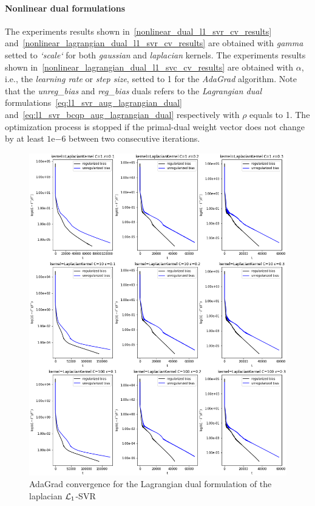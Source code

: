 \paragraph{Nonlinear dual formulations}

The experiments results shown in~\ref{nonlinear_dual_l1_svr_cv_results} and~\ref{nonlinear_lagrangian_dual_l1_svr_cv_results} are obtained with \emph{gamma} setted to \emph{`scale`} for both \emph{gaussian} and \emph{laplacian} kernels. The experiments results shown in~\ref{nonlinear_lagrangian_dual_l1_svc_cv_results} are obtained with $\alpha$, i.e., the \emph{learning rate} or \emph{step size}, setted to 1 for the \emph{AdaGrad} algorithm. Note that the \emph{unreg\_bias} and \emph{reg\_bias} duals refers to the \emph{Lagrangian dual} formulations~\eqref{eq:l1_svr_aug_lagrangian_dual} and~\eqref{eq:l1_svr_bcqp_aug_lagrangian_dual} respectively with $\rho$ equals to 1. The optimization process is stopped if the primal-dual weight vector does not change by at least $1\mathrm{e}{-6}$  between two consecutive iterations.





\begin{figure}[H]
	\centering
	\includegraphics[scale=0.55]{img/laplacian_lagrangian_dual_l1_svr_loss_history}
	\caption{AdaGrad convergence for the Lagrangian dual formulation of the laplacian $\protect \mathcal{L}_1$-SVR}
	\label{fig:laplacian_lagrangian_dual_l1_svr_loss_history}
\end{figure}

